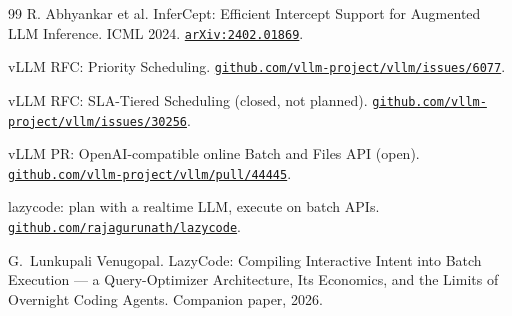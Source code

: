 \documentclass[conference]{IEEEtran}
\newcommand{\code}[1]{\texttt{#1}}
\begin{document}
\begin{thebibliography}{99}
 R. Abhyankar et al. InferCept: Efficient Intercept Support for Augmented
LLM Inference. ICML 2024. \href{https://arxiv.org/abs/2402.01869}{\code{arXiv:2402.01869}}.

 vLLM RFC: Priority Scheduling.
\href{https://github.com/vllm-project/vllm/issues/6077}{\code{github.com/vllm-project/vllm/issues/6077}}.

 vLLM RFC: SLA-Tiered Scheduling (closed, not planned).
\href{https://github.com/vllm-project/vllm/issues/30256}{\code{github.com/vllm-project/vllm/issues/30256}}.

 vLLM PR: OpenAI-compatible online Batch and Files API (open).
\href{https://github.com/vllm-project/vllm/pull/44445}{\code{github.com/vllm-project/vllm/pull/44445}}.

 lazycode: plan with a realtime LLM, execute on batch APIs.
\href{https://github.com/rajagurunath/lazycode}{\code{github.com/rajagurunath/lazycode}}.

 G.~Lunkupali Venugopal. LazyCode: Compiling Interactive Intent
into Batch Execution --- a Query-Optimizer Architecture, Its Economics, and the Limits of
Overnight Coding Agents. Companion paper, 2026.

\end{thebibliography}
\end{document}
